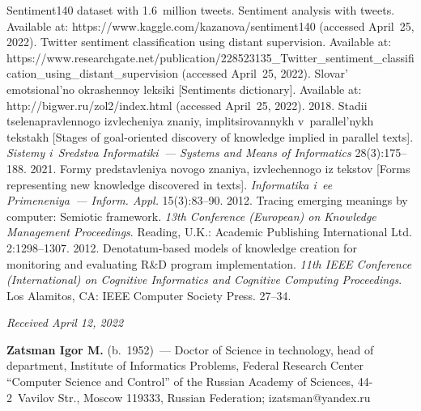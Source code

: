 \begin{multicols}{2}
{{\begin{thebibliography}{99}
Sentiment140 dataset with 1.6~million tweets.  Sentiment analysis with tweets. Available at: {\sf 
https://\linebreak www.kaggle.com/kazanova/sentiment140} (accessed April~25, 2022).
Twitter sentiment classification using distant supervision. Available at: {\sf 
https://www.researchgate.net/\linebreak publication/228523135\_Twitter\_sentiment\_\linebreak classification\_using\_distant\_supervision} (accessed 
April~25, 2022).
Slovar' emotsional'no okrashennoy leksiki [Sentiments dictionary]. Available at: {\sf 
http://bigwer.ru/zol2/\linebreak index.html} (accessed April~25, 2022).
 2018. Stadii tselenapravlennogo izvlecheniya znaniy, implitsirovannykh 
v~parallel'nykh tekstakh [Stages of goal-oriented discovery of knowledge implied in parallel texts]. 
\textit{Sistemy i~Sredstva Informatiki~--- Systems and Means of Informatics} 28(3):175--188.
 2021. Formy predstavleniya novogo znaniya, izvlechennogo iz tekstov [Forms 
representing new knowledge discovered in texts]. \textit{Informatika i~ee Primeneniya~--- Inform. 
Appl.} 15(3):83--90.
 2012. Tracing emerging meanings by computer: Semiotic framework. \textit{13th 
Conference (European) on Knowledge Management Proceedings}. Reading, U.K.: Academic Publishing International Ltd. 
2:1298--1307.
 2012. Denotatum-based models of knowledge creation for monitoring and 
evaluating R\&D program implementation. \textit{11th IEEE Conference (International) on Cognitive 
Informatics and Cognitive Computing Proceedings}. Los Alamitos, CA: IEEE Computer Society Press. 
27--34.
\end{thebibliography}

 }
 }

\end{multicols}

\vspace*{-9pt}

\hfill{\small\textit{Received April 12, 2022}}


\vspace*{-22pt}

\Contr

\vspace*{-5pt}

\noindent
\textbf{Zatsman Igor M.} (b.\ 1952)~--- Doctor of Science in technology, head of department, 
Institute of Informatics Problems, Federal Research Center ``Computer Science and Control'' of the 
Russian Academy of Sciences, 44-2~Vavilov Str., Moscow 119333, Russian Federation; 
\mbox{izatsman@yandex.ru}


